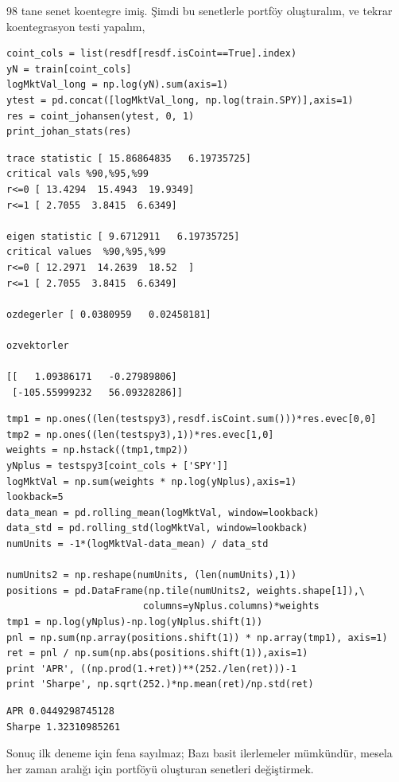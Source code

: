 \documentclass[12pt,fleqn]{article}\usepackage{../../common}
\begin{document}
98 tane senet koentegre imiş. Şimdi bu senetlerle portföy oluşturalım, ve
tekrar koentegrasyon testi yapalım,

\begin{verbatim}
coint_cols = list(resdf[resdf.isCoint==True].index)
yN = train[coint_cols]
logMktVal_long = np.log(yN).sum(axis=1)
ytest = pd.concat([logMktVal_long, np.log(train.SPY)],axis=1)
res = coint_johansen(ytest, 0, 1)
print_johan_stats(res)
\end{verbatim}

\begin{verbatim}
trace statistic [ 15.86864835   6.19735725]
critical vals %90,%95,%99
r<=0 [ 13.4294  15.4943  19.9349]
r<=1 [ 2.7055  3.8415  6.6349]

eigen statistic [ 9.6712911   6.19735725]
critical values  %90,%95,%99
r<=0 [ 12.2971  14.2639  18.52  ]
r<=1 [ 2.7055  3.8415  6.6349]

ozdegerler [ 0.0380959   0.02458181]

ozvektorler

[[   1.09386171   -0.27989806]
 [-105.55999232   56.09328286]]
\end{verbatim}

\begin{verbatim}
tmp1 = np.ones((len(testspy3),resdf.isCoint.sum()))*res.evec[0,0]
tmp2 = np.ones((len(testspy3),1))*res.evec[1,0]
weights = np.hstack((tmp1,tmp2))
yNplus = testspy3[coint_cols + ['SPY']]
logMktVal = np.sum(weights * np.log(yNplus),axis=1)
lookback=5
data_mean = pd.rolling_mean(logMktVal, window=lookback)
data_std = pd.rolling_std(logMktVal, window=lookback)
numUnits = -1*(logMktVal-data_mean) / data_std

numUnits2 = np.reshape(numUnits, (len(numUnits),1))
positions = pd.DataFrame(np.tile(numUnits2, weights.shape[1]),\
                        columns=yNplus.columns)*weights
tmp1 = np.log(yNplus)-np.log(yNplus.shift(1))
pnl = np.sum(np.array(positions.shift(1)) * np.array(tmp1), axis=1)
ret = pnl / np.sum(np.abs(positions.shift(1)),axis=1)
print 'APR', ((np.prod(1.+ret))**(252./len(ret)))-1
print 'Sharpe', np.sqrt(252.)*np.mean(ret)/np.std(ret)
\end{verbatim}

\begin{verbatim}
APR 0.0449298745128
Sharpe 1.32310985261
\end{verbatim}

Sonuç ilk deneme için fena sayılmaz; Bazı basit ilerlemeler mümkündür,
mesela her zaman aralığı için portföyü oluşturan senetleri değiştirmek.
\end{document}
